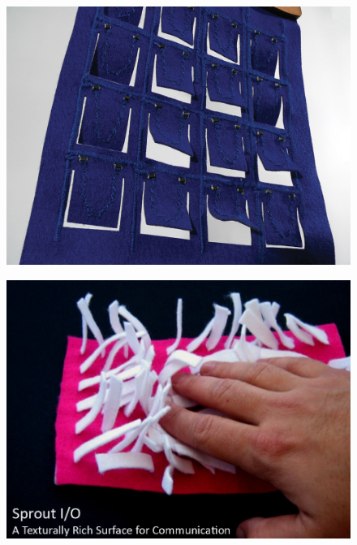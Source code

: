\begin{figure}[h]
\centering
\begin{minipage}[b]{.44\textwidth}
  \centering
  \includegraphics[width=\linewidth]{figures/touch/shutters}
  \label{sofa_interaction:shutters}
\end{minipage}
\hspace{0.02\textwidth}
\begin{minipage}[b]{.44\textwidth}
  \centering
  \includegraphics[width=\linewidth]{figures/touch/sprout}
  \label{sofa_interaction:sprout}
\end{minipage}
\end{figure}

